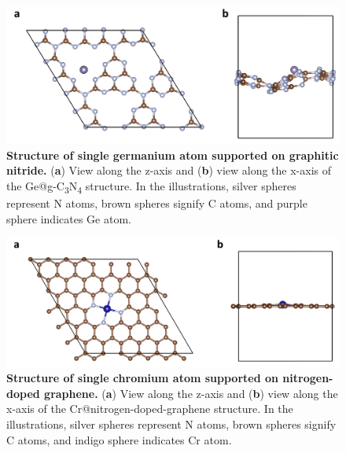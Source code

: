 \begin{figure}[htbp]
  \centering
  \includegraphics[width=\textwidth]{supp_fig2_Ge_g-C3N4.png}
  \caption{\textbf{Structure of single germanium atom supported on graphitic nitride.}
  (\textbf{a}) View along the z-axis and (\textbf{b}) view along the x-axis
  of the Ge@g-C\textsubscript{3}N\textsubscript{4} structure.
  In the illustrations, silver spheres represent N atoms, brown spheres
  signify C atoms, and purple sphere indicates Ge atom.}
  \label{supp_fig2:Ge_g-C3N4}
\end{figure}

\begin{figure}[htbp]
  \centering
  \includegraphics[width=\textwidth]{supp_fig3_Cr-n-gra.png}
  \caption{\textbf{Structure of single chromium atom supported on nitrogen-doped graphene.}
  (\textbf{a}) View along the z-axis and (\textbf{b}) view along the x-axis
  of the Cr@nitrogen-doped-graphene structure.
  In the illustrations, silver spheres represent N atoms, brown spheres
  signify C atoms, and indigo sphere indicates Cr atom.}
  \label{supp_fig3:Cr-n-gra}
\end{figure}

